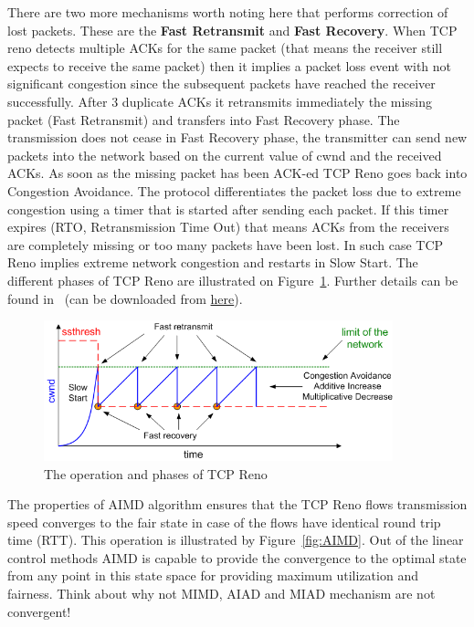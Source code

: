 \documentclass[a4paper]{article}
\begin{document}
There are two more mechanisms worth noting here that performs correction of lost packets. These are the \textbf{Fast Retransmit} and \textbf{Fast Recovery}. When TCP reno detects multiple ACKs for the same packet (that means the receiver still expects to receive the same packet) then it implies a packet loss event with not significant congestion since the subsequent packets have reached the receiver successfully. After 3 duplicate ACKs it retransmits immediately the missing packet (Fast Retransmit) and transfers into Fast Recovery phase. The transmission does not cease in Fast Recovery phase, the transmitter can send new packets into the network based on the current value of cwnd and the received ACKs. As soon as the missing packet has been ACK-ed TCP Reno goes back into Congestion Avoidance. The protocol differentiates the packet loss due to extreme congestion using a timer that is started after sending each packet. If this timer expires (RTO, Retransmission Time Out) that means ACKs from the receivers are completely missing or too many packets have been lost. In such case TCP Reno implies extreme network congestion and restarts in Slow Start. The different phases of TCP Reno are illustrated on Figure~\ref{fig:TCP-Reno-operation}. Further details can be found in~\cite{CongestionAvoidance} (can be downloaded from \href{http://qosip.tmit.bme.hu/cgi-bin/twiki/viewfile/VITT5318/WebHome?rev=1;filename=jacobson88congestion.pdf}{here}).


\begin{figure}[H]
    \centering
    \includegraphics[width=0.9\textwidth]{figures/tcp-reno.png}
    \caption{The operation and phases of TCP Reno}
    \label{fig:TCP-Reno-operation}
\end{figure}

The properties of AIMD algorithm ensures that the TCP Reno flows transmission speed converges to the fair state in case of the flows have identical round trip time (RTT). This operation is illustrated by Figure~\ref{fig:AIMD}. Out of the linear control methods AIMD is capable to provide the convergence to the optimal state from any point in this state space for providing maximum utilization and fairness. Think about why not MIMD, AIAD and MIAD mechanism are not convergent!
\end{document}
